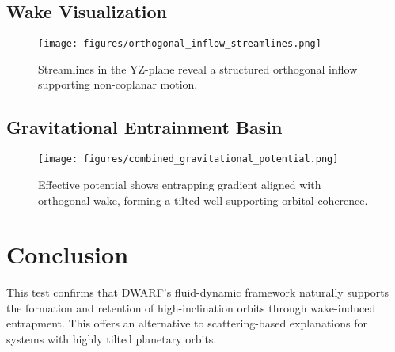 \documentclass[12pt]{article}
\begin{document}
\subsection{Wake Visualization}
\begin{figure}[H]
    \centering
    \texttt{[image: figures/orthogonal\_inflow\_streamlines.png]}
    \caption{Streamlines in the YZ-plane reveal a structured orthogonal inflow supporting non-coplanar motion.}
\end{figure}

\subsection{Gravitational Entrainment Basin}
\begin{figure}[H]
    \centering
    \texttt{[image: figures/combined\_gravitational\_potential.png]}
    \caption{Effective potential shows entrapping gradient aligned with orthogonal wake, forming a tilted well supporting orbital coherence.}
\end{figure}

\section{Conclusion}
This test confirms that DWARF's fluid-dynamic framework naturally supports the formation and retention of high-inclination orbits through wake-induced entrapment. This offers an alternative to scattering-based explanations for systems with highly tilted planetary orbits.
\end{document}
